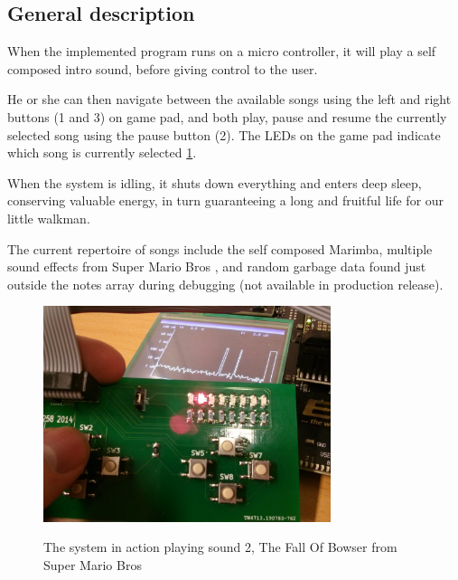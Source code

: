 \subsection{General description}

When the implemented program runs on a micro controller, it will play a self composed intro sound, before giving control to the user.

He or she can then navigate between the available songs using the left and right buttons (1 and 3) on game pad, and both play, pause and resume the currently selected song using the pause button (2).
The LEDs on the game pad indicate which song is currently selected \ref{fig:systemaction}.

When the system is idling, it shuts down everything and enters deep sleep, conserving valuable energy, in turn guaranteeing a long and fruitful life for our little walkman.

The current repertoire of songs include the self composed Marimba, multiple sound effects from Super Mario Bros \cite{mariobros}, and random garbage data found just outside the notes array during debugging (not available in production release).

\begin{figure}[H]
    \centering
    \includegraphics[width=0.75\textwidth]{figures/system-in-action.jpg}
    \label{fig:systemaction}
    \caption{The system in action playing sound 2, The Fall Of Bowser from Super Mario Bros}
\end{figure}
